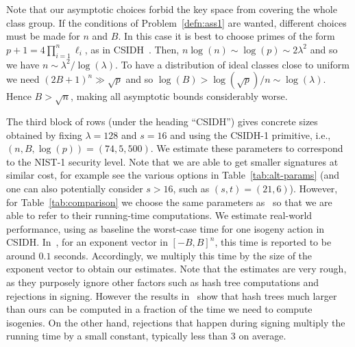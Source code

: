 \documentclass{llncs}
\begin{document}
Note that our asymptotic choices forbid the key space from covering the whole class group.
If the conditions of Problem~\ref{defn:ass1} are wanted, different choices must be made for $n$ and $B$.
In this case it is best to choose primes of the form $p+1 = 4\prod_{i=1}^n\ell_i$, as in CSIDH~\cite{CLMPR18}.
Then, $n\log(n)\sim\log(p)\sim 2\lambda^2$ and so we have  $n \sim \lambda^2 / \log(\lambda)$.
To have a distribution of ideal classes close to uniform we need $(2B+1)^n \gg \sqrt{p}$ and so $\log(B) > \log( \sqrt{p} )/n \sim \log(\lambda)$.
Hence $B > \sqrt{n}$, making all asymptotic bounds considerably worse.

The third block of rows (under the heading ``CSIDH'') gives concrete sizes obtained by fixing $\lambda=128$ and $s=16$ and using the CSIDH-1 primitive, i.e., $(n,B,\log(p)) = (74,5,500)$.
We estimate these parameters to correspond to the NIST-1 security level.
Note that we are able to get smaller signatures at similar cost, for example see the various options in Table~\ref{tab:alt-params} (and one can also potentially consider $s > 16$, such as $(s,t)=(21,6)$).
However, for Table~\ref{tab:comparison} we choose the same parameters as~\cite{CLMPR18} so that we are able to refer to their running-time computations.
We estimate real-world performance, using as baseline the worst-case time for one isogeny action in CSIDH.
In~\cite{CLMPR18,cryptoeprint:2018:782}, for an exponent vector in $[-B,B]^n$, this time is reported to be around $0.1$ seconds.
Accordingly, we multiply this time by the size of the exponent vector to obtain our estimates.
Note that the estimates are very rough, as they purposely ignore other factors such as hash tree computations and rejections in signing.
However the results in~\cite{10.1007/978-3-662-49384-7_15,sphincs+} show that hash trees much larger than ours can be computed in a fraction of the time we need to compute isogenies.
On the other hand, rejections that happen during signing multiply the running time by a small constant, typically less than $3$ on average.
\end{document}
